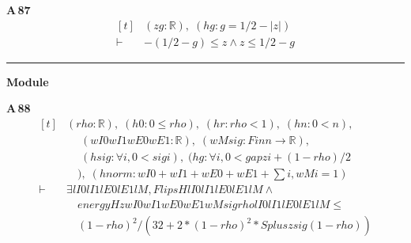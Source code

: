 \noindent\textbf{A\,87}\quad{}
{\footnotesize\[ \begin{aligned}[t]
&(\mathit{z} \mathit{g} : \mathbb{R} ),\; (\mathit{hg} : \mathit{g} = 1/2 - |\mathit{z}|)\\
\vdash\;&-(1/2 - \mathit{g}) \leq \mathit{z} \wedge \mathit{z} \leq 1/2 - \mathit{g}
\end{aligned} \]}

\vspace{4pt}\noindent\rule{\columnwidth}{0.4pt}\par\vspace{2pt}
\noindent\textbf{Module }\par\vspace{3pt}

\noindent\textbf{A\,88}\quad{}
{\footnotesize\[ \begin{aligned}[t]
&(\mathit{rho} : \mathbb{R} ),\; (\mathit{h0} : 0 \leq \mathit{rho}),\; (\mathit{hr} : \mathit{rho} < 1),\; (\mathit{hn} : 0 < \mathit{n}),\\
&\quad \; (\mathit{wI0} \mathit{wI1} \mathit{wE0} \mathit{wE1} : \mathbb{R} ),\; (\mathit{wM} \mathit{sig} : \mathit{Fin} \mathit{n} \to \mathbb{R} ),\\
&\quad \; (\mathit{hsig} : \forall \mathit{i}, 0 < \mathit{sig} \mathit{i}),\; (\mathit{hg} : \forall \mathit{i}, 0 < \mathit{gap} \mathit{z} \mathit{i} + (1-\mathit{rho})/2\\
&\quad ),\; (\mathit{hnorm} : \mathit{wI0} + \mathit{wI1} + \mathit{wE0} + \mathit{wE1} + \textstyle\sum \mathit{i}, \mathit{wM} \mathit{i} = 1)\\
\vdash\;&\exists \mathit{lI0} \mathit{lI1} \mathit{lE0} \mathit{lE1} \mathit{lM}, \mathit{FlipsH} \mathit{lI0} \mathit{lI1} \mathit{lE0} \mathit{lE1} \mathit{lM} \wedge\\
&\quad \mathit{energyH} \mathit{z} \mathit{wI0} \mathit{wI1} \mathit{wE0} \mathit{wE1} \mathit{wM} \mathit{sig} \mathit{rho} \mathit{lI0} \mathit{lI1} \mathit{lE0} \mathit{lE1} \mathit{lM} \leq\\
&\quad (1-\mathit{rho})^{2}/(32 + 2*(1-\mathit{rho})^{2}*\mathit{Splus} \mathit{z} \mathit{sig} (1-\mathit{rho}))
\end{aligned} \]}

